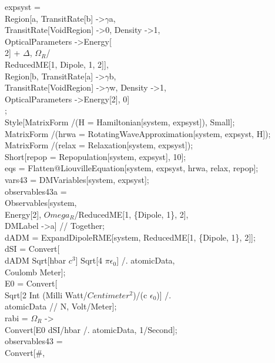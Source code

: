 expsyst = {\\
   Region[a, TransitRate[b] -\textgreater $\gamma$a, \\
    TransitRate[VoidRegion] -\textgreater 0, Density -\textgreater 1, \\
    OpticalParameters -\textgreater {Energy[\\
        2] + $\Delta$, $\Omega_R$/ \\
       ReducedME[1, {Dipole, 1}, 2]}],\\
   Region[b, TransitRate[a] -\textgreater $\gamma$b, \\
    TransitRate[VoidRegion] -\textgreater $\gamma$w, Density -\textgreater 1, \\
    OpticalParameters -\textgreater {Energy[2], 0}]\\
   };\\
Style[MatrixForm /\@ (H = Hamiltonian[system, expsyst]), Small];\\
MatrixForm /\@ (hrwa = RotatingWaveApproximation[system, expsyst, H]);\\
MatrixForm /\@ (relax = Relaxation[system, expsyst]);\\
Short[repop = Repopulation[system, expsyst], 10];\\
eqs = Flatten@LiouvilleEquation[system, expsyst, hrwa, relax, repop];\\
vars43 = DMVariables[system, expsyst];\\
observables43a = \\
  Observables[system,\\ 
    Energy[2], $Omega_R$/ReducedME[1, \{Dipole, 1\}, 2], \\
    DMLabel -\textgreater a] // Together;\\
dADM = ExpandDipoleRME[system, ReducedME[1, \{Dipole, 1\}, 2]];\\
dSI = Convert[\\
   dADM Sqrt[hbar $c^3$] Sqrt[4 $\pi\epsilon_0$] /. atomicData, \\
   Coulomb Meter];\\
E0 = Convert[\\
   Sqrt[2 Int (Milli Watt/$Centimeter^2$)/(c $\epsilon_0$)] /. \\
     atomicData // N, Volt/Meter];\\
rabi = $\Omega_R$ -\textgreater \\
   Convert[E0 dSI/hbar /. atomicData, 1/Second];\\
observables43 = \\
  Convert[\#, \\
